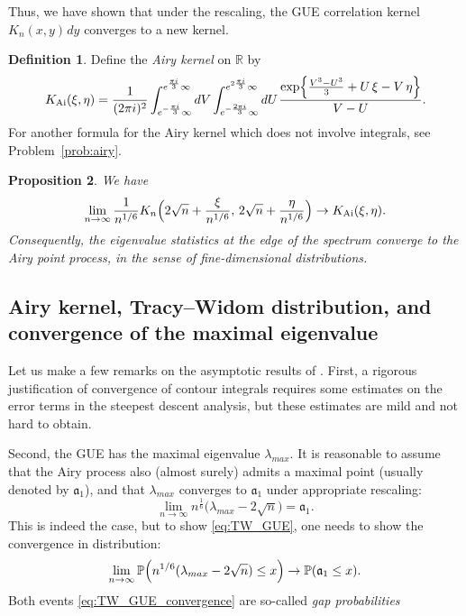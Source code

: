 \documentclass[letterpaper,11pt,oneside,reqno]{article}
\numberwithin{equation}{section}
\newcommand{\ssp}{\hspace{1pt}}
\newtheorem{proposition}{Proposition}[section]
\theoremstyle{definition}
\newtheorem{definition}[proposition]{Definition}
\begin{document}
Thus, we have shown that under the rescaling, the GUE correlation kernel
$K_n(x,y)\ssp dy$ converges to a new kernel.
\begin{definition}
	\label{def:Airy_kernel}
	Define the \emph{Airy kernel} on $\mathbb{R}$ by
	\begin{equation*}
		K_{\mathrm{Ai}}(\xi,\eta)=\frac{1}{(2\pi i)^2}
		\int_{e^{-\frac{\pi i}{3}}\infty}^{e^{\frac{\pi i}{3}}\infty}dV
		\int_{e^{-\frac{2\pi i}{3}}\infty}^{e^{2\frac{\pi i}{3}}\infty}dU
		\ssp
		\frac{\exp\Bigl\{\frac{V^3-U^3}{3}+U\,\xi-V\,\eta\Bigr\}}{V-U}.
	\end{equation*}
	For another formula for the Airy kernel
	which does not involve integrals,
	see 
	Problem~\ref{prob:airy}.
\end{definition}

\begin{proposition}
	\label{prop:edge}
	We have
	\begin{equation*}
		\lim_{n\to\infty}
		\frac{1}{n^{1/6}}K_n\Bigl(2\sqrt{n}+\frac{\xi}{n^{1/6}},\,2\sqrt{n}+\frac{\eta}{n^{1/6}}\Bigr)
		\to
		K_{\mathrm{Ai}}(\xi,\eta).
	\end{equation*}
	Consequently, the eigenvalue statistics at the edge of the spectrum converge to the Airy point process, in the sense of fine-dimensional distributions.
\end{proposition}

\subsection{Airy kernel, Tracy--Widom distribution, and convergence of the maximal
eigenvalue}

Let us make a few remarks on the asymptotic results of 
.
First, 
a rigorous justification of convergence
of contour integrals requires some estimates on the error terms 
in the steepest descent analysis, but these
estimates are mild and not hard to obtain.

Second, the GUE has the maximal eigenvalue $\lambda_{max}$. It is reasonable
to assume that the Airy process also (almost surely) admits a maximal point 
(usually denoted by $\mathfrak{a}_1$),
and that $\lambda_{max}$
converges to $\mathfrak{a}_1$ under appropriate rescaling:
\begin{equation}
	\label{eq:TW_GUE}
	\lim_{n\to\infty}n^{\frac{1}{6}}\bigl(\lambda_{max}-2\sqrt{n}\bigr)=\mathfrak{a}_1.
\end{equation}
This is indeed the case, but to show \eqref{eq:TW_GUE}, one needs to
show the convergence in distribution:
\begin{equation}
	\label{eq:TW_GUE_convergence}
	\lim_{n\to \infty}
	\mathbb{P}\Bigl(n^{1/6}(\lambda_{max}-2\sqrt{n})\le x\Bigr)
	\to
	\mathbb{P}(\mathfrak{a}_1\le x).
\end{equation}
Both events \eqref{eq:TW_GUE_convergence} are so-called
\emph{gap probabilities}
\end{document}
